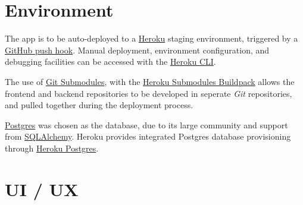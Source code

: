 \documentclass[11pt,a4paper]{report}
\begin{document}
\section{Environment}

The app is to be auto-deployed to a \href{https://www.heroku.com/}{Heroku} staging environment, triggered by a \href{https://devcenter.heroku.com/articles/github-integration}{GitHub push hook}. Manual deployment, environment configuration, and debugging facilities can be accessed with the \href{https://devcenter.heroku.com/articles/heroku-cli}{Heroku CLI}.

The use of \href{https://git-scm.com/book/en/v2/Git-Tools-Submodules}{Git Submodules}, with the \href{https://github.com/dmathieu/heroku-buildpack-submodules}{Heroku Submodules Buildpack} allows the frontend and backend repositories to be developed in seperate \textit{Git} repositories, and pulled together during the deployment process.

\href{https://www.postgresql.org/}{Postgres} was chosen as the database, due to its large community and support from \href{https://www.sqlalchemy.org/}{SQLAlchemy}. Heroku provides integrated Postgres database provisioning through \href{https://www.heroku.com/postgres}{Heroku Postgres}.


\section{UI / UX}
\end{document}
